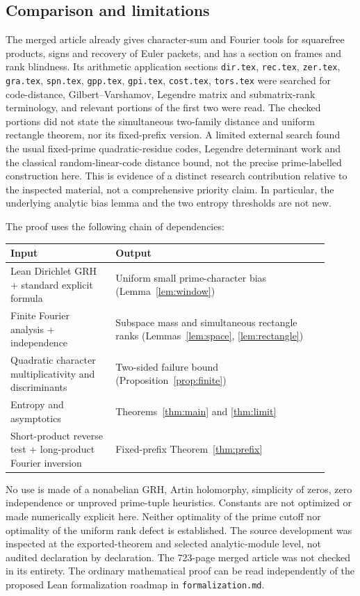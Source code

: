 \documentclass[11pt]{article}
\theoremstyle{remark}\newtheorem{remark}[theorem]{Remark}
\begin{document}
\subsection{Comparison and limitations}
The merged article already gives character-sum and Fourier tools for squarefree products, signs and recovery of Euler packets, and has a section on frames and rank blindness. Its arithmetic application sections \texttt{dir.tex}, \texttt{rec.tex}, \texttt{zer.tex}, \texttt{gra.tex}, \texttt{spn.tex}, \texttt{gpp.tex}, \texttt{gpi.tex}, \texttt{cost.tex}, \texttt{tors.tex} were searched for code-distance, Gilbert--Varshamov, Legendre matrix and submatrix-rank terminology, and relevant portions of the first two were read. The checked portions did not state the simultaneous two-family distance and uniform rectangle theorem, nor its fixed-prefix version. A limited external search found the usual fixed-prime quadratic-residue codes, Legendre determinant work and the classical random-linear-code distance bound, not the precise prime-labelled construction here. This is evidence of a distinct research contribution relative to the inspected material, not a comprehensive priority claim. In particular, the underlying analytic bias lemma and the two entropy thresholds are not new.

The proof uses the following chain of dependencies:
\begin{center}
\begin{tabular}{p{0.30\linewidth}p{0.61\linewidth}}
\toprule
Input & Output\\
\midrule
Lean Dirichlet GRH + standard explicit formula & Uniform small prime-character bias (Lemma~\ref{lem:window})\\
Finite Fourier analysis + independence & Subspace mass and simultaneous rectangle ranks (Lemmas~\ref{lem:space}, \ref{lem:rectangle})\\
Quadratic character multiplicativity and discriminants & Two-sided failure bound (Proposition~\ref{prop:finite})\\
Entropy and asymptotics & Theorems~\ref{thm:main} and \ref{thm:limit}\\
Short-product reverse test + long-product Fourier inversion & Fixed-prefix Theorem~\ref{thm:prefix}\\
\bottomrule
\end{tabular}
\end{center}
No use is made of a nonabelian GRH, Artin holomorphy, simplicity of zeros, zero independence or unproved prime-tuple heuristics. Constants are not optimized or made numerically explicit here. Neither optimality of the prime cutoff nor optimality of the uniform rank defect is established. The source development was inspected at the exported-theorem and selected analytic-module level, not audited declaration by declaration. The 723-page merged article was not checked in its entirety. The ordinary mathematical proof can be read independently of the proposed Lean formalization roadmap in \texttt{formalization.md}.
\end{document}
